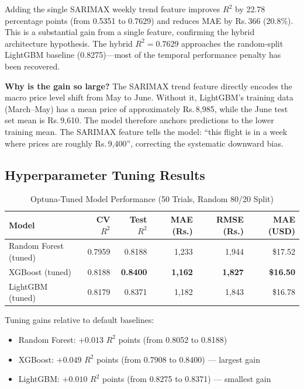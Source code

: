 \documentclass[12pt, a4paper]{article}
\begin{document}
Adding the single SARIMAX weekly trend feature improves $R^2$ by 22.78
percentage points (from 0.5351 to 0.7629) and reduces MAE by Rs.\,366
(20.8\%).  This is a substantial gain from a single feature, confirming
the hybrid architecture hypothesis.  The hybrid $R^2 = 0.7629$ approaches
the random-split LightGBM baseline (0.8275)---most of the temporal
performance penalty has been recovered.

\textbf{Why is the gain so large?}  The SARIMAX trend feature directly
encodes the macro price level shift from May to June.  Without it,
LightGBM's training data (March--May) has a mean price of approximately
Rs.\,8{,}985, while the June test set mean is Rs.\,9{,}610.  The model
therefore anchors predictions to the lower training mean.  The SARIMAX
feature tells the model: ``this flight is in a week where prices are
roughly Rs.\,9{,}400'', correcting the systematic downward bias.

\subsection{Hyperparameter Tuning Results}

\begin{table}[h]
\caption{Optuna-Tuned Model Performance (50 Trials, Random 80/20 Split)}
\label{tab:tuned}
\centering
\begin{tabular}{lrrrrr}
\toprule
\textbf{Model} & \textbf{CV $R^2$} & \textbf{Test $R^2$} & \textbf{MAE (Rs.)} & \textbf{RMSE (Rs.)} & \textbf{MAE (USD)} \\
\midrule
Random Forest (tuned) & 0.7959 & 0.8188 & 1{,}233 & 1{,}944 & \$17.52 \\
XGBoost (tuned)       & 0.8188 & \textbf{0.8400} & \textbf{1{,}162} & \textbf{1{,}827} & \textbf{\$16.50} \\
LightGBM (tuned)      & 0.8179 & 0.8371 & 1{,}182 & 1{,}843 & \$16.78 \\
\bottomrule
\end{tabular}
\end{table}

Tuning gains relative to default baselines:
\begin{itemize}
    \item Random Forest: $+0.013$ $R^2$ points (from 0.8052 to 0.8188)
    \item XGBoost: $+0.049$ $R^2$ points (from 0.7908 to 0.8400) --- largest gain
    \item LightGBM: $+0.010$ $R^2$ points (from 0.8275 to 0.8371) --- smallest gain
\end{itemize}
\end{document}
